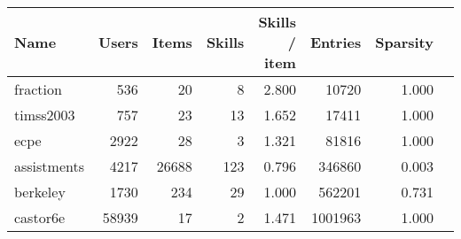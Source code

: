 \begin{tabular}{lrrrrrrr}
\toprule
        Name &  Users &  Items &  Skills &  Skills / item &  Entries &  Sparsity\\
\midrule
    fraction &    536 &     20 &       8 &            2.800 &    10720 &                  1.000\\
   timss2003 &    757 &     23 &      13 &            1.652 &    17411 &                  1.000\\
        ecpe &   2922 &     28 &       3 &            1.321 &    81816 &                  1.000\\
 \alert{assistments} &   4217 &  26688 &     123 &            0.796 &   346860 &                  0.003\\
    \alert{berkeley} &   1730 &    234 &      29 &            1.000 &   562201 &                  0.731\\
    castor6e &  58939 &     17 &       2 &            1.471 &  1001963 &                  1.000\\
\bottomrule
\end{tabular}
